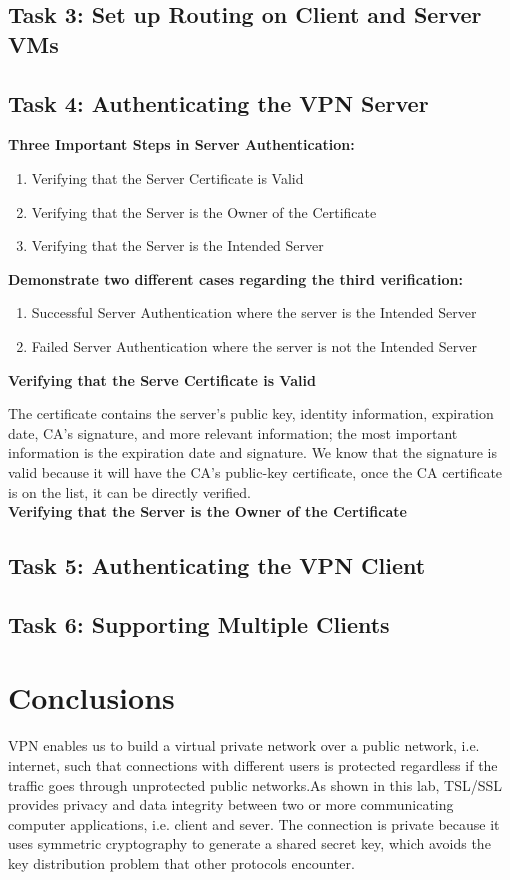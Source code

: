 \documentclass[12pt]{article}
\begin{document}
\subsection{Task 3: Set up Routing on Client and Server VMs}
\subsection{Task 4: Authenticating the VPN Server}
\textbf{Three Important Steps in Server Authentication:}
\begin{enumerate}
\item Verifying that the Server Certificate is Valid
\item Verifying that the Server is the Owner of the Certificate
\item Verifying that the Server is the Intended Server
\end{enumerate}
\textbf{Demonstrate two different cases regarding the third verification:}
\begin{enumerate}
\item  Successful Server Authentication where the server is the Intended Server
\item Failed Server Authentication where the server is not the Intended Server \\
\end{enumerate}
\textbf{Verifying that the Serve Certificate is Valid}
\item The certificate contains the server's public key, identity information, expiration date, CA's signature, and more relevant information; the most important information is the expiration date and signature. We know that the signature is valid because it will have the CA's public-key certificate, once the CA certificate is on the list, it can be directly verified. \\

\textbf{Verifying that the Server is the Owner of the Certificate}

\subsection{Task 5: Authenticating the VPN Client}
\subsection{Task 6: Supporting Multiple Clients}



\section{Conclusions}
VPN enables us to build a virtual private network over a public network, i.e. internet, such that connections with different users is protected regardless if the traffic goes through unprotected public networks.As shown in this lab, TSL/SSL provides privacy and data integrity between two or more communicating computer applications, i.e. client and sever. The connection is private because it uses symmetric cryptography to generate a shared secret key, which avoids the key distribution problem that other protocols encounter. 
\end{document}
